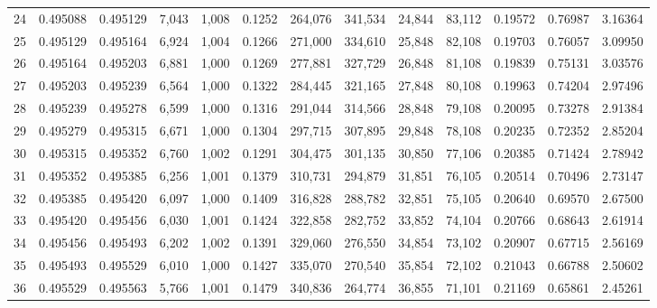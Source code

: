 \begin{tabular}{rrrrrrrrrrrrr}
24  &  0.495088 &  0.495129 &   7,043 &  1,008 &                                     0.1252 &  264,076 &  341,534 &   24,844 &   83,112 &  0.19572 &  0.76987 &  3.16364 \\
25  &  0.495129 &  0.495164 &   6,924 &  1,004 &                                     0.1266 &  271,000 &  334,610 &   25,848 &   82,108 &  0.19703 &  0.76057 &  3.09950 \\
26  &  0.495164 &  0.495203 &   6,881 &  1,000 &                                     0.1269 &  277,881 &  327,729 &   26,848 &   81,108 &  0.19839 &  0.75131 &  3.03576 \\
27  &  0.495203 &  0.495239 &   6,564 &  1,000 &                                     0.1322 &  284,445 &  321,165 &   27,848 &   80,108 &  0.19963 &  0.74204 &  2.97496 \\
28  &  0.495239 &  0.495278 &   6,599 &  1,000 &                                     0.1316 &  291,044 &  314,566 &   28,848 &   79,108 &  0.20095 &  0.73278 &  2.91384 \\
29  &  0.495279 &  0.495315 &   6,671 &  1,000 &                                     0.1304 &  297,715 &  307,895 &   29,848 &   78,108 &  0.20235 &  0.72352 &  2.85204 \\
30  &  0.495315 &  0.495352 &   6,760 &  1,002 &                                     0.1291 &  304,475 &  301,135 &   30,850 &   77,106 &  0.20385 &  0.71424 &  2.78942 \\
31  &  0.495352 &  0.495385 &   6,256 &  1,001 &                                     0.1379 &  310,731 &  294,879 &   31,851 &   76,105 &  0.20514 &  0.70496 &  2.73147 \\
32  &  0.495385 &  0.495420 &   6,097 &  1,000 &                                     0.1409 &  316,828 &  288,782 &   32,851 &   75,105 &  0.20640 &  0.69570 &  2.67500 \\
33  &  0.495420 &  0.495456 &   6,030 &  1,001 &                                     0.1424 &  322,858 &  282,752 &   33,852 &   74,104 &  0.20766 &  0.68643 &  2.61914 \\
34  &  0.495456 &  0.495493 &   6,202 &  1,002 &                                     0.1391 &  329,060 &  276,550 &   34,854 &   73,102 &  0.20907 &  0.67715 &  2.56169 \\
35  &  0.495493 &  0.495529 &   6,010 &  1,000 &                                     0.1427 &  335,070 &  270,540 &   35,854 &   72,102 &  0.21043 &  0.66788 &  2.50602 \\
36  &  0.495529 &  0.495563 &   5,766 &  1,001 &                                     0.1479 &  340,836 &  264,774 &   36,855 &   71,101 &  0.21169 &  0.65861 &  2.45261 \\

\end{tabular}
